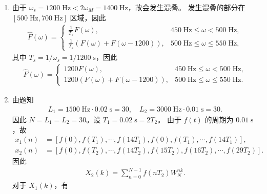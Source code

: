 \begin{solution}
    \begin{enumerate}[label=(\arabic*)]
        \item 由于 $\omega_s = 1200\;\mathrm{Hz} < 2\omega_M = 1400\;\mathrm{Hz}$，故会发生混叠。
            发生混叠的部分在 $[500\;\mathrm{Hz}, 700\;\mathrm{Hz}]$ 区域，因此
            \begin{align*}
                \hat{F}(\omega) = \begin{cases}
                    \frac{1}{T_s}F(\omega), & 450\;\mathrm{Hz} \le \omega < 500\;\mathrm{Hz}, \\
                    \frac{1}{T_s}\left(F(\omega) + F(\omega - 1200)\right), & 500\;\mathrm{Hz} \le \omega \le 550\;\mathrm{Hz},
                \end{cases}
            \end{align*}
            其中 $T_s = 1 / \omega_s = 1 / 1200\;\mathrm{s}$，因此
            \begin{align*}
                \hat{F}(\omega) = \begin{cases}
                    1200F(\omega), & 450\;\mathrm{Hz} \le \omega < 500\;\mathrm{Hz}, \\
                    1200\left(F(\omega) + F(\omega - 1200)\right), & 500\;\mathrm{Hz} \le \omega \le 550\;\mathrm{Hz}.
                \end{cases}
            \end{align*}
        \item 由题知
            \begin{align*}
                L_1 = 1500\;\mathrm{Hz} \cdot 0.02\;\mathrm{s} = 30, \quad
                L_2 = 3000\;\mathrm{Hz} \cdot 0.01\;\mathrm{s} = 30.
            \end{align*}
            因此 $N = L_1 = L_2 = 30$。设 $T_1 = 0.02\;\mathrm{s} = 2T_2$。
            由于 $f(t)$ 的周期为 $0.01\;\mathrm{s}$，故
            \begin{align*}
                x_1(n) & = [f(0), f(T_1), \cdots, f(14T_1), f(0), f(T_1), \cdots, f(14T_1)], \\
                x_2(n) & = [f(0), f(T_2), \cdots, f(14T_2), f(15T_2), f(16T_2), \cdots, f(29T_2)].
            \end{align*}
            因此
            \begin{align*}
                X_2(k) = \sum_{n = 0}^{N - 1}f(nT_2)W_N^{nk}.
            \end{align*}
            对于 $X_1(k)$，有
            \begin{align*}

\end{align*}
\end{enumerate}
\end{solution}

